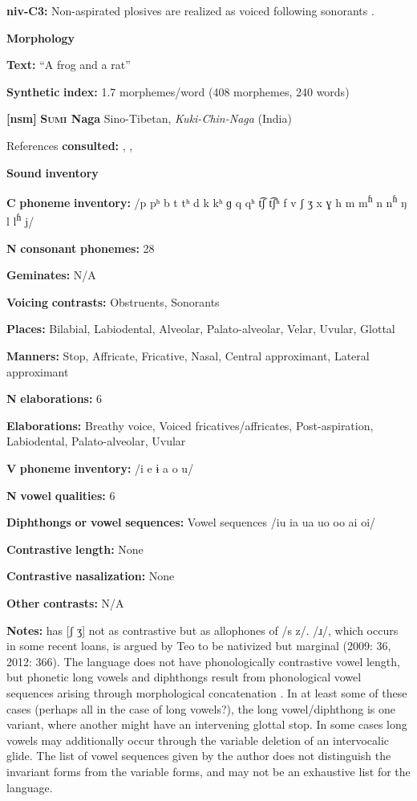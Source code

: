 \begin{styleBody}
\textbf{niv-C3:} Non-aspirated plosives are realized as voiced following sonorants \citep[25]{Shiraishi2006}.

\textbf{Morphology}

\textbf{Text:} “A frog and a rat” \citep[58-61]{Gruzdeva1998}

\textbf{Synthetic} \textbf{index:} 1.7 morphemes/word (408 morphemes, 240 words)

\textbf{[nsm]}   \textbf{\textsc{Sumi} \textbf{Naga}}  Sino-Tibetan, \textit{Kuki-Chin-Naga} (India)

References \textbf{consulted:} \citet{Sreedhar1980}, \citet{Teo2009}, \citet{Teo2012}

\textbf{Sound} \textbf{inventory}

\textbf{C} \textbf{phoneme} \textbf{inventory:} /p pʰ b t tʰ d k kʰ ɡ q qʰ t͡ʃ t͡ʃʰ f v ʃ ʒ x ɣ h m m\textsuperscript{ɦ} n n\textsuperscript{ɦ} ŋ l l\textsuperscript{ɦ} j/

\textbf{N} \textbf{consonant} \textbf{phonemes:} 28

\textbf{Geminates:} N/A

\textbf{Voicing} \textbf{contrasts:} Obstruents, Sonorants

\textbf{Places:} Bilabial, Labiodental, Alveolar, Palato-alveolar, Velar, Uvular, Glottal

\textbf{Manners:} Stop, Affricate, Fricative, Nasal, Central approximant, Lateral approximant

\textbf{N} \textbf{elaborations:} 6

\textbf{Elaborations:} Breathy voice, Voiced fricatives/affricates, Post-aspiration, Labiodental, Palato-alveolar, Uvular

\textbf{V} \textbf{phoneme} \textbf{inventory:} /i e ɨ a o u/

\textbf{N} \textbf{vowel} \textbf{qualities:} 6

\textbf{Diphthongs} \textbf{or} \textbf{vowel} \textbf{sequences:} Vowel sequences /iu ia ua uo oo ai oi/

\textbf{Contrastive} \textbf{length:} None

\textbf{Contrastive} \textbf{nasalization:} None

\textbf{Other} \textbf{contrasts:} N/A

\textbf{Notes:} \citet{Sreedhar1980} has [ʃ ʒ] not as contrastive but as allophones of /s z/. /ɹ/, which occurs in some recent loans, is argued by Teo to be nativized but marginal (2009: 36, 2012: 366). The language does not have phonologically contrastive vowel length, but phonetic long vowels and diphthongs result from phonological vowel sequences arising through morphological concatenation \citep[58-9]{Teo2009}. In at least some of these cases (perhaps all in the case of long vowels?), the long vowel/diphthong is one variant, where another might have an intervening glottal stop. In some cases long vowels may additionally occur through the variable deletion of an intervocalic glide. The list of vowel sequences given by the author does not distinguish the invariant forms from the variable forms, and may not be an exhaustive list for the language.


\end{styleBody}
